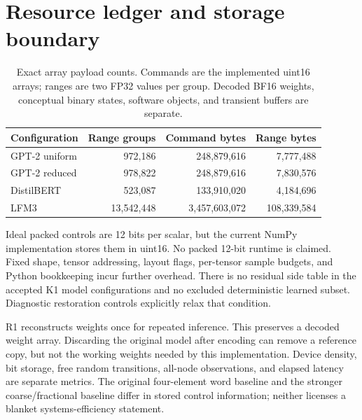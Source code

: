 \documentclass[11pt]{article}
\begin{document}
\section{Resource ledger and storage boundary}
\begin{table}[htbp]\centering\small
\caption{Exact array payload counts. Commands are the implemented uint16 arrays; ranges are two FP32 values per group. Decoded BF16 weights, conceptual binary states, software objects, and transient buffers are separate.}\label{tab:storage}
\begin{tabular}{lrrr}\toprule
Configuration & Range groups & Command bytes & Range bytes\\\midrule
GPT-2 uniform & 972,186 & 248,879,616 & 7,777,488\\
GPT-2 reduced & 978,822 & 248,879,616 & 7,830,576\\
DistilBERT & 523,087 & 133,910,020 & 4,184,696\\
LFM3 & 13,542,448 & 3,457,603,072 & 108,339,584\\\bottomrule
\end{tabular}
\end{table}

Ideal packed controls are 12 bits per scalar, but the current NumPy implementation stores them in uint16. No packed 12-bit runtime is claimed. Fixed shape, tensor addressing, layout flags, per-tensor sample budgets, and Python bookkeeping incur further overhead. There is no residual side table in the accepted K1 model configurations and no excluded deterministic learned subset. Diagnostic restoration controls explicitly relax that condition.

R1 reconstructs weights once for repeated inference. This preserves a decoded weight array. Discarding the original model after encoding can remove a reference copy, but not the working weights needed by this implementation. Device density, bit storage, free random transitions, all-node observations, and elapsed latency are separate metrics. The original four-element word baseline and the stronger coarse/fractional baseline differ in stored control information; neither licenses a blanket systems-efficiency statement.
\end{document}
